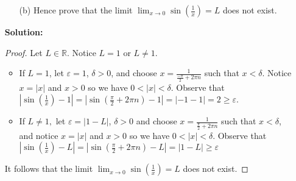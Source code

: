 \documentclass[letterpaper,12pt]{article}
\theoremstyle{definition}
\begin{document}
\pagebreak
\begin{enumerate}
    \item[] \begin{enumerate}
        \item[(b)] Hence prove that the limit $\lim_{x \rightarrow 0} \sin \left (\frac{1}{x} \right ) = L$ does not exist. 
        \end{enumerate}
\begin{mdframed}
    \textbf{Solution:} \begin{proof}
        Let $L \in \mathbb{R}$. Notice $L = 1$ or $L \neq 1$.
           \begin{itemize}
           \item If $L=1$, let $\varepsilon = 1$, $\delta > 0$, and choose $x = \frac{1}{\frac{-\pi}{2}+2\pi n}$ such that $x < \delta$.  Notice $x = |x|$ and $x > 0$ so we have $0 < |x| < \delta$. Observe that $\left |\sin \left ( \frac{1}{x} \right ) - 1 \right |=  \left | \sin \left (  \frac{\pi}{2}+2\pi n \right ) - 1\right | = |-1-1| = 2 \geq \varepsilon$.
          \item  If $L\neq 1,$ let $\varepsilon = |1-L|$, $\delta > 0$ and choose $x = \frac{1}{\frac{\pi}{2}+2\pi n}$ such that $x < \delta$, and notice $x = |x|$ and $x > 0$ so we have $0 < |x| < \delta$. Observe that $\left |\sin \left ( \frac{1}{x} \right ) - L \right |=  \left | \sin \left (  \frac{\pi}{2}+2\pi n \right ) - L\right | = |1-L| \geq \varepsilon$ 
           \end{itemize}
           It follows that the limit $\lim_{x \rightarrow 0} \sin \left (\frac{1}{x} \right ) = L$ does not exist.
    \end{proof}
\end{mdframed}
        \end{enumerate}
\end{document}
